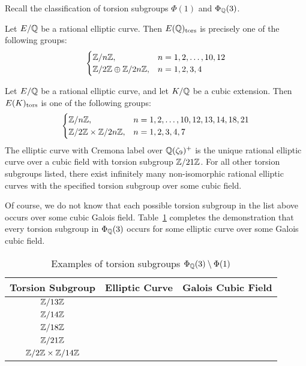 Recall the classification of torsion subgroups $\Phi(1)$ and $\Phi_{\mathbb{Q}}(3)$.


\begin{thm}
Let $E/\mathbb{Q}$ be a rational elliptic curve. Then $E(\mathbb{Q})_{\text{tors}}$ is precisely one of the following groups:
	\[
	\begin{cases}
	\mathbb{Z}/n\mathbb{Z}, & n= 1, 2, \ldots, 10, 12 \\
	\mathbb{Z}/2\mathbb{Z} \oplus \mathbb{Z}/2n\mathbb{Z}, & n= 1, 2, 3, 4
	\end{cases}
	\]
\end{thm}


\begin{thm}
Let $E/\mathbb{Q}$ be a rational elliptic curve, and let $K/\mathbb{Q}$ be a cubic extension. Then $E(K)_{\text{tors}}$ is one of the following groups:
	\[
	\begin{cases}
	\mathbb{Z}/n\mathbb{Z}, & n= 1,2 ,\ldots, 10, 12, 13, 14, 18, 21 \\
	\mathbb{Z}/2\mathbb{Z} \times \mathbb{Z}/2n\mathbb{Z}, & n= 1, 2, 3, 4, 7
	\end{cases}
	\]
The elliptic curve with Cremona label \ostbt{} over $\mathbb{Q}(\zeta_9)^+$ is the unique rational elliptic curve over a cubic field with torsion subgroup $\mathbb{Z}/21\mathbb{Z}$. For all other torsion subgroups listed, there exist infinitely many non-isomorphic rational elliptic curves with the specified torsion subgroup over some cubic field. 
\end{thm}


Of course, we do not know that each possible torsion subgroup in the list above occurs over some cubic Galois field. Table~\ref{tab:3qsm1} completes the demonstration that every torsion subgroup in $\Phi_{\mathbb{Q}}(3)$ occurs for some elliptic curve over some Galois cubic field. 


	\begin{table}[!ht]
	\centering
	\caption{Examples of torsion subgroups $\Phi_{\mathbb{Q}}(3) \setminus \Phi(1)$\label{tab:3qsm1}}
	\begin{tabular}{ccc} \hline
	Torsion Subgroup & Elliptic Curve & Galois Cubic Field \\ \hline
	$\mathbb{Z}/13\mathbb{Z}$ & \ofsbo{} & \qzetasp{} \\
	$\mathbb{Z}/14\mathbb{Z}$ & \fnat{} & \qzetasp{} \\
	$\mathbb{Z}/18\mathbb{Z}$ & \ofaf{} & \qzetasp{} \\
	$\mathbb{Z}/21\mathbb{Z}$ & \ostbo{} & \qzetanp{} \\
	$\mathbb{Z}/2\mathbb{Z} \times \mathbb{Z}/14\mathbb{Z}$ & \onttco{} & \ttnsoo{}
	\end{tabular}
	\end{table}


